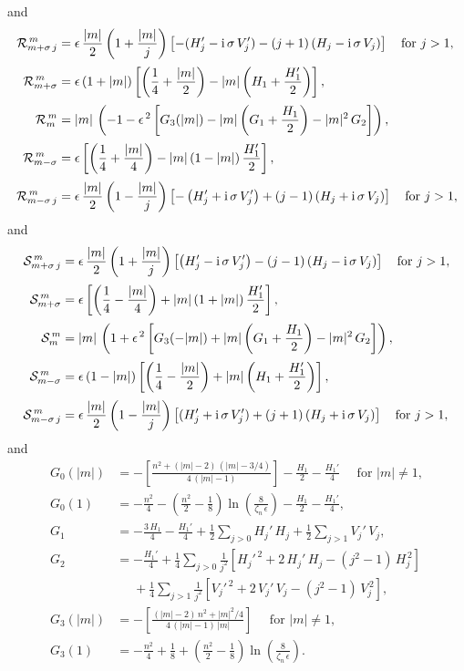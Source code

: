 \documentclass[12pt,prb,aps]{revtex4-1}
\begin{document}
and
\begin{align}
{\cal R}_{m+\sigma\,j}^{\,m}  &=\epsilon\,\frac{|m|}{2}\left(1+\frac{|m|}{j}\right)\left[-(H_j'-{\rm i}\,\sigma\,V_j')-(j+1)\left(H_j-{\rm i}\,\sigma\,V_j\right)\right]\mbox{~~~for $j>1$},\\[0.5ex]
{\cal R}_{m+\sigma}^{\,m} &=\epsilon\,(1+|m|)\left[\left(\frac{1}{4}+\frac{|m|}{2}\right)-|m|\left(H_1+\frac{H_1'}{2}\right)\right],\\[0.5ex]
{\cal R}_m^{\,m} &= |m|\,\left(-1-\epsilon^{\,2}\left[G_3 (|m|)- |m|\left(G_1+\frac{H_1}{2}\right)- |m|^2\,G_2\right]\right),\\[0.5ex]
{\cal R}_{m-\sigma}^{\,m} &=\epsilon\left[\left(\frac{1}{4}+\frac{|m|}{4}\right)
-|m|\,(1-|m|)\,\frac{H_1'}{2}\right],\\[0.5ex]
{\cal R}_{m-\sigma\,j}^{\,m} &= \epsilon\,\frac{|m|}{2}\left(1-\frac{|m|}{j}\right)\left[-\left(H_j'+{\rm i}\,\sigma\,V_j'\right)+(j-1)\left(
H_j+{\rm i}\,\sigma\,V_j\right)\right]\mbox{~~~for $j>1$},
\end{align}
and 
\begin{align}
{\cal S}_{m+\sigma\,j}^{\,m}  &=\epsilon\,\frac{|m|}{2}\left(1+\frac{|m|}{j}\right)\left[\left(H_j'-{\rm i}\,\sigma\,V_j'\right)-(j-1)\left(
H_j-{\rm i}\,\sigma\,V_j\right)\right]\mbox{~~~for $j>1$}, \\[0.5ex]
{\cal S}_{m+\sigma}^{\,m} &= \epsilon\left[\left(\frac{1}{4}-\frac{|m|}{4}\right)
+|m|\,(1+|m|)\,\frac{H_1'}{2}\right],\\[0.5ex]
{\cal S}_m^{\,m} &=|m|\, \left(1+\epsilon^{\,2}\left[G_3 (-|m|)+ |m|\left(G_1+\frac{H_1}{2}\right)- |m|^2\,G_2\right]\right),\\[0.5ex]
{\cal S}_{m-\sigma}^{\,m} &=\epsilon\,(1-|m|)\left[\left(\frac{1}{4}-\frac{|m|}{2}\right)+|m|\left(H_1+\frac{H_1'}{2}\right)\right], \\[0.5ex]
{\cal S}_{m-\sigma\,j}^{\,m} &=\epsilon\,\frac{|m|}{2}\left(1-\frac{|m|}{j}\right)\left[(H_j'+{\rm i}\,\sigma\,V_j')+(j+1)\left(H_j+{\rm i}\,\sigma\,V_j\right)\right]\mbox{~~~for $j>1$},
\end{align}
and 
\begin{align}
G_0(|m|) &= -\left[\frac{n^2+(|m|-2)\,(|m|-3/4)}{4\,(|m|-1)}\right]-\frac{H_1}{2}-\frac{H_1'}{4}\mbox{~~~~for $|m|\neq 1$},\\[0.5ex]
G_0(1) &= -\frac{n^2}{4}-\left(\frac{n^2}{2}-\frac{1}{8}\right)\ln\left(\frac{8}{\zeta_n\,\epsilon}\right)-\frac{H_1}{2}-\frac{H_1'}{4},\\[0.5ex]
G_1  &= -\frac{3\,H_1}{4} - \frac{H_1'}{4} + \frac{1}{2}\sum_{j>0}H_j'\,H_j+ \frac{1}{2}\sum_{j>1}V_j'\,V_j,\\[0.5ex]
G_2 &= -\frac{H_1'}{4}+\frac{1}{4}\sum_{j>0}\frac{1}{j^2}\left[H_j'^{\,2}+ 2\,H_j'\,H_j - (j^2-1)\,H_j^{\,2}\right]\nonumber\\[0.5ex]&\phantom{=}+\frac{1}{4}\sum_{j>1}\frac{1}{j^2}\left[V_j'^{\,2}+ 2\,V_j'\,V_j - (j^2-1)\,V_j^{\,2}\right],\\[0.5ex]
G_3(|m|)& =- \left[\frac{(|m|-2)\,n^2+ |m|^2/4}{4\,(|m|-1)\,|m|}\right]\mbox{~~~~for $|m|\neq 1$},\\[0.5ex]
G_3(1)&= -\frac{n^2}{4} +\frac{1}{8}+\left(\frac{n^2}{2}-\frac{1}{8}\right)\ln\left(\frac{8}{\zeta_n\,\epsilon}\right).
\end{align}
\end{document}
